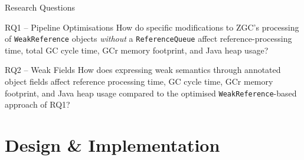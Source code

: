 \documentclass[aspectratio=169]{beamer}
\begin{document}
\begin{frame}{Research Questions}
    \begin{block}{RQ1 -- Pipeline Optimisations}
        \small
        How do specific modifications to ZGC's processing of \texttt{WeakReference}
        objects \emph{without} a \texttt{ReferenceQueue} affect reference-processing
        time, total \ac{GC} cycle time, \ac{GCr} memory footprint, and Java heap usage?
    \end{block}
    \vspace{0.6em}
    \begin{block}{RQ2 -- Weak Fields}
        \small
        How does expressing weak semantics through annotated object fields affect
        reference processing time, \ac{GC} cycle time, \ac{GCr} memory footprint, and Java heap
        usage compared to the optimised \texttt{WeakReference}-based approach of RQ1?
    \end{block}
\end{frame}


\section{Design \& Implementation}
\end{document}
